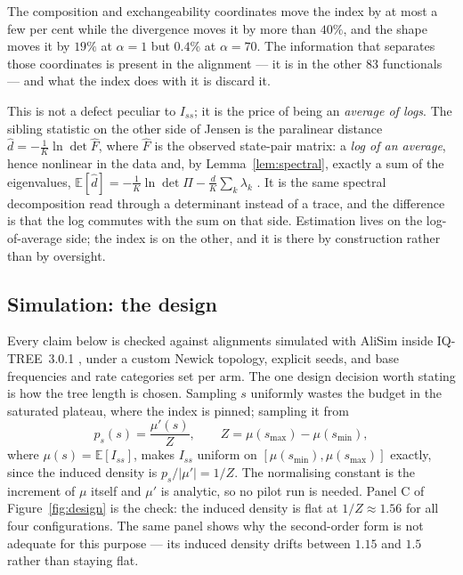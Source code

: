 \documentclass[11pt]{article}
\newcommand{\Iss}{I_{ss}}
\newcommand{\E}{\mathbb{E}}
\theoremstyle{definition}
\theoremstyle{remark}
\begin{document}
The composition and exchangeability coordinates move the index by at most a
few per cent while the divergence moves it by more than $40\%$, and the shape
moves it by $19\%$ at $\alpha=1$ but $0.4\%$ at $\alpha=70$. The information
that separates those coordinates is present in the alignment --- it is in the
other $83$ functionals --- and what the index does with it is discard it.

This is not a defect peculiar to $\Iss$; it is the price of being an
\emph{average of logs}. The sibling statistic on the other side of Jensen is
the paralinear distance $\hat d=-\frac1K\ln\det\hat F$, where $\hat F$ is the
observed state-pair matrix: a \emph{log of an average}, hence nonlinear in
the data and, by Lemma~\ref{lem:spectral}, exactly a sum of the eigenvalues,
$\E[\hat d]=-\frac1K\ln\det\Pi-\frac{d}{K}\sum_k\lambda_k$
\citep{lockhart1994recovering}. It is the same spectral decomposition read
through a determinant instead of a trace, and the difference is that the log
commutes with the sum on that side. Estimation lives on the log-of-average
side; the index is on the other, and it is there by construction rather than
by oversight.

\subsection{Simulation: the design}
\label{sec:design}

Every claim below is checked against alignments simulated with AliSim
\citep{lytrong2022alisim} inside IQ-TREE~3.0.1 \citep{minh2020iqtree2}, under
a custom Newick topology, explicit seeds, and base frequencies and rate
categories set per arm. The one design decision worth
stating is how the tree length is chosen. Sampling $s$ uniformly wastes the
budget in the saturated plateau, where the index is pinned; sampling it from
\begin{equation}
  p_s(s)=\frac{\mu'(s)}{Z},\qquad Z=\mu(s_{\max})-\mu(s_{\min}),
  \label{eq:design}
\end{equation}
where $\mu(s)=\E[\Iss]$, makes $\Iss$ uniform on
$[\mu(s_{\min}),\mu(s_{\max})]$ exactly, since the induced density is
$p_s/\lvert\mu'\rvert=1/Z$. The normalising constant is the increment of
$\mu$ itself and $\mu'$ is analytic, so no pilot run is needed. Panel C of
Figure~\ref{fig:design} is the check: the induced density is flat at
$1/Z\approx1.56$ for all four configurations. The same panel shows why the
second-order form is not adequate for this purpose --- its induced density
drifts between $1.15$ and $1.5$ rather than staying flat.
\end{document}
